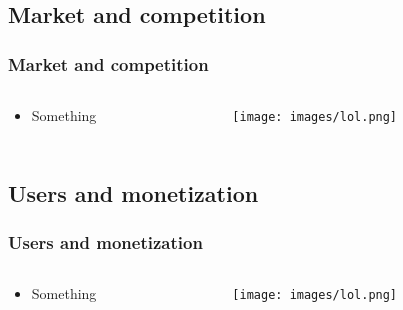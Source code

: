 \documentclass[aspectratio=43, fleqn]{beamer}
\begin{document}
\subsection{Market and competition}
\begin{frame}
\frametitle{Market and competition}
\begin{columns} 
    \begin{column}{.4\textwidth}
    \vspace{-1.5cm}
    \begin{itemize}
        \item Something
    \end{itemize}
    \end{column}
    \begin{column}{.6\textwidth}
        \vspace{-0.8cm}
        \begin{center}
            \texttt{[image: images/lol.png]}
        \end{center}
    \end{column}
\end{columns}
\end{frame}

\section[Users and monetization]{}
\subsection{Users and monetization}
\begin{frame}
\frametitle{Users and monetization}
\begin{columns} 
    \begin{column}{.4\textwidth}
    \vspace{-1.5cm}
    \begin{itemize}
        \item Something
    \end{itemize}
    \end{column}
    \begin{column}{.6\textwidth}
        \vspace{-0.8cm}
        \begin{center}
            \texttt{[image: images/lol.png]}
        \end{center}
    \end{column}
\end{columns}
\end{frame}
\end{document}
